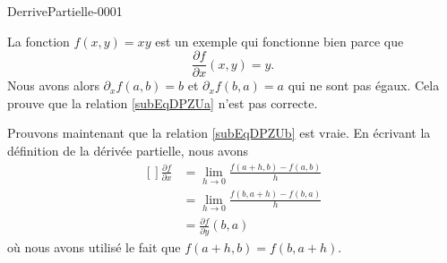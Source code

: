 
\begin{corrige}{DerrivePartielle-0001}

	La fonction $f(x,y)=xy$ est un exemple qui fonctionne bien parce que
	\begin{equation}
		\frac{ \partial f }{ \partial x }(x,y)=y.
	\end{equation}
	Nous avons alors $\partial_xf(a,b)=b$ et $\partial_xf(b,a)=a$ qui ne sont pas égaux. Cela prouve que la relation \eqref{subEqDPZUa} n'est pas correcte.

	Prouvons maintenant que la relation \eqref{subEqDPZUb} est vraie. En écrivant la définition de la dérivée partielle, nous avons
	\begin{equation}
		\begin{aligned}[]
			\frac{ \partial f }{ \partial x }&=\lim_{h\to0}\frac{ f(a+h,b)-f(a,b) }{ h }\\
			&=\lim_{h\to 0}\frac{ f(b,a+h)-f(b,a) }{ h }\\
			&=\frac{ \partial f }{ \partial y }(b,a)
		\end{aligned}
	\end{equation}
	où nous avons utilisé le fait que $f(a+h,b)=f(b,a+h)$.
\end{corrige}
